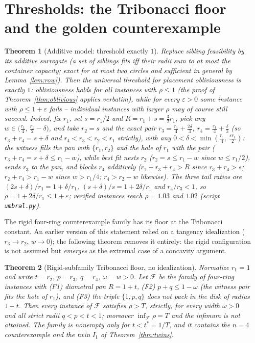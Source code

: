 \documentclass[11pt]{article}
\newtheorem{theorem}{Theorem}
\theoremstyle{definition}
\begin{document}
\section{Thresholds: the Tribonacci floor and the golden counterexample}
\label{sec:threshold}

\begin{theorem}[Additive model: threshold exactly $1$]\label{thm:additive}
Replace sibling feasibility by its additive surrogate (a set of siblings fits
iff their radii sum to at most the container capacity; exact for at most two
circles and sufficient in general by Lemma~\ref{lem:row}). Then the
\emph{universal} threshold for placement obliviousness is exactly $1$:
obliviousness holds for \emph{all} instances with $\rho\le1$ (the proof of
Theorem~\ref{thm:oblivious} applies verbatim), while for every
$\varepsilon>0$ \emph{some} instance with $\rho\le1+\varepsilon$ fails --
individual instances with larger $\rho$ may of course still succeed.
Indeed, fix $r_1$, set $s=r_1/2$ and $R=r_1+s=\tfrac32r_1$, pick any
$w\in\bigl(\tfrac{r_1}4,\,\tfrac{r_1}2-\delta\bigr)$, and take $r_2=s$
and the exact pair
$r_3=\tfrac{r_1}4+\tfrac{2\delta}3$, $r_4=\tfrac{r_1}4+\tfrac\delta3$
(so $r_3+r_4=s+\delta$ and $r_4<r_3<r_2<r_1$ strictly), with any
$0<\delta<\min(\tfrac{r_1}4,\ \tfrac{\varepsilon r_1}2)$: the witness
fills the pan with $\{r_1,r_2\}$ and
the hole of $r_1$ with the pair ($r_3+r_4=s+\delta\le r_1-w$), while
best fit nests $r_2$ ($r_2=s\le r_1-w$ since $w\le r_1/2$), sends $r_3$
to the pan, and blocks $r_4$ additively ($r_1+r_3+r_4>R$ since
$r_3+r_4>s$; $r_2+r_4>r_1-w$ since $w>r_1/4$; $r_4>r_2-w$ likewise).
The three tail ratios are $(2s+\delta)/r_1=1+\delta/r_1$,
$(s+\delta)/s=1+2\delta/r_1$ and $r_4/r_3<1$, so
$\rho=1+2\delta/r_1\le1+\varepsilon$; verified instances reach
$\rho=1.03$ and $1.02$ (script \texttt{umbral.py}).
\end{theorem}

The rigid four-ring counterexample family has its floor at the Tribonacci
constant. An earlier version of this statement relied on a tangency
idealization ($r_3\to r_2$, $w\to0$); the following theorem removes it
entirely: the rigid configuration is not assumed but \emph{emerges} as the
extremal case of a concavity argument.

\begin{theorem}[Rigid-subfamily Tribonacci floor, no idealization]
\label{thm:rigidfloor}
Normalize $r_1=1$ and write $t=r_2$, $p=r_3$, $q=r_4$, $\omega=w>0$.
Let $\mathcal F$ be the family of four-ring instances with
\textup{(F1)} diametral pan $R=1+t$,
\textup{(F2)} $p+q\le 1-\omega$ (the witness pair fits the hole of $r_1$), and
\textup{(F3)} the triple $\{1,p,q\}$ does not pack in the disk of radius
$1+t$. Then every instance of $\mathcal F$ satisfies $\rho>T$, strictly, for
every width $\omega>0$ and all strict radii $q<p<t<1$; moreover
$\inf_{\mathcal F}\rho=T$ and the infimum is not attained. The family is
nonempty only for $t<t^{*}=1/T$, and it contains the $n=4$ counterexample and
the twin $I_1$ of Theorem~\ref{thm:twins}.
\end{theorem}
\end{document}
